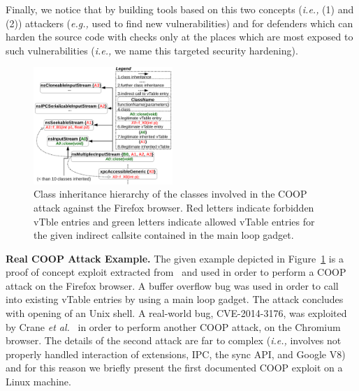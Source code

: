 Finally, we notice that by building tools based on this two concepts (\textit{i.e.,} (1) and (2))
attackers (\textit{e.g.,} used to find new vulnerabilities) and for defenders which can 
harden the source code with checks only at the places which are most exposed 
to such vulnerabilities (\textit{i.e.,} we name this targeted security hardening).

\begin{figure}[h!]
    \centering
    \includegraphics[width=0.47\textwidth]{figures/class_hierarchy.pdf}
\caption{Class inheritance hierarchy of the classes involved in the COOP attack against the Firefox browser. Red letters 
indicate forbidden vTble entries and green letters indicate allowed vTable entries for the given indirect callsite
contained in the main loop gadget.}
\label{Class exploit}
\end{figure}

\textbf{Real COOP Attack Example.}
\label{Running Example: CVE X}
The given example depicted in Figure~\ref{Class exploit}
is a proof of concept exploit extracted from~\cite{schuster:coop} and used in order to perform 
a COOP attack on the Firefox browser. A buffer overflow bug was used in order to call 
into existing vTable entries by using a main loop gadget. 
The attack concludes with opening of an Unix shell. 
A real-world bug, CVE-2014-3176, was exploited by Crane \textit{et al.}~\cite{crane:readactor++}
in order to perform another COOP attack, on the Chromium browser. The details of the 
second attack are far to complex (\textit{i.e.,} involves not properly handled interaction of 
extensions, IPC, the sync API, and Google V8) and for this reason we briefly present the first 
documented COOP exploit on a Linux machine.

